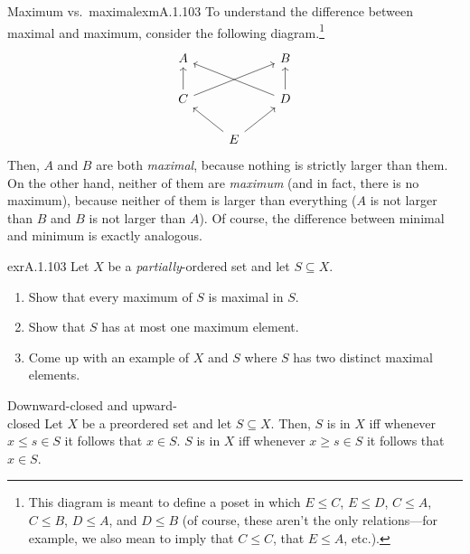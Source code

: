 \begin{exm}{Maximum vs.~maximal}{exmA.1.103}
To understand the difference between maximal and maximum, consider the following diagram.\footnote{This diagram is meant to define a poset in which $E\leq C$, $E\leq D$, $C\leq A$, $C\leq B$, $D\leq A$, and $D\leq B$ (of course, these aren't the only relations---for example, we also mean to imply that $C\leq C$, that $E\leq A$, etc.).}
\begin{equation}
\begin{tikzcd}
A & & B \\
C \ar[u] \ar[rru] & & D \ar[llu] \ar[u] \\
  & E \ar[lu] \ar[ru] &
\end{tikzcd}
\end{equation}
Then, $A$ and $B$ are both \emph{maximal}, because nothing is strictly larger than them.  On the other hand, neither of them are \emph{maximum} (and in fact, there is no maximum), because neither of them is larger than everything ($A$ is not larger than $B$ and $B$ is not larger than $A$).  Of course, the difference between minimal and minimum is exactly analogous.
\end{exm}
\begin{exr}{}{exrA.1.103}
Let $X$ be a \emph{partially}-ordered set and let $S\subseteq X$.
\begin{enumerate}
\item Show that every maximum of $S$ is maximal in $S$.
\item Show that $S$ has at most one maximum element.
\item Come up with an example of $X$ and $S$ where $S$ has two distinct maximal elements.
\end{enumerate}
\end{exr}
\begin{dfn}{Downward-closed and upward-\\closed}{}
Let $X$ be a preordered set and let $S\subseteq X$.  Then, $S$ is  in $X$ iff whenever $x\leq s\in S$ it follows that $x\in S$.  $S$ is  in $X$ iff whenever $x\geq s\in S$ it follows that $x\in S$.
\end{dfn}
